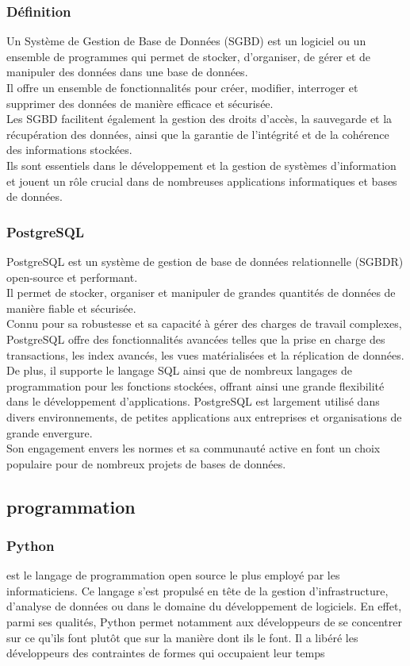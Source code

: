 \subsubsection{Définition}
Un Système de Gestion de Base de Données (SGBD) est un logiciel ou un ensemble de programmes qui permet de stocker, d'organiser, de gérer et de manipuler des données dans une base de données. \\
Il offre un ensemble de fonctionnalités pour créer, modifier, interroger et supprimer des données de manière efficace et sécurisée. \\
Les SGBD facilitent également la gestion des droits d'accès, la sauvegarde et la récupération des données, ainsi que la garantie de l'intégrité et de la cohérence des informations stockées. \\
Ils sont essentiels dans le développement et la gestion de systèmes d'information et jouent un rôle crucial dans de nombreuses applications informatiques et bases de données.
\subsubsection{PostgreSQL}
PostgreSQL est un système de gestion de base de données relationnelle (SGBDR) open-source et performant.\\
Il permet de stocker, organiser et manipuler de grandes quantités de données de manière fiable et sécurisée.\\
Connu pour sa robustesse et sa capacité à gérer des charges de travail complexes, PostgreSQL offre des fonctionnalités avancées telles que la prise en charge des transactions,
les index avancés, les vues matérialisées et la réplication de données. De plus, il supporte le langage SQL ainsi que de nombreux langages de programmation pour les fonctions stockées,
offrant ainsi une grande flexibilité dans le développement d'applications. PostgreSQL est largement utilisé dans divers environnements,
de petites applications aux entreprises et organisations de grande envergure. \\
Son engagement envers les normes et sa communauté active en font un choix populaire pour de nombreux projets de bases de données.
\subsection{programmation}
\subsubsection{Python}
 est le langage de programmation open source le plus employé par les
informaticiens. Ce langage s’est propulsé en tête de la gestion d’infrastructure,
d’analyse de données ou dans le domaine du développement de logiciels. En
effet, parmi ses qualités, Python permet notamment aux développeurs de se
concentrer sur ce qu’ils font plutôt que sur la manière dont ils le font. Il a
libéré les développeurs des contraintes de formes qui occupaient leur temps
